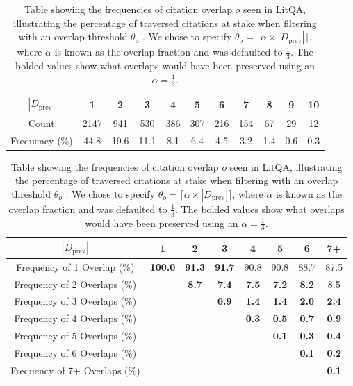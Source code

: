 \begin{table}[htb]
\caption{Various statistics on citation traversal.}
\begin{subtable}{\textwidth}
\centering
\begin{tabular}{| c || c c c c c c c c c c |}
\hline
$|D_\text{prev}|$ & 1 & 2 & 3 & 4 & 5 & 6 & 7 & 8 & 9 & 10 \\
\hline
Count & 2147 & 941 & 530 & 386 & 307 & 216 & 154 & 67 & 29 & 12 \\
\hline
Frequency (\%) & 44.8 & 19.6 & 11.1 & 8.1 & 6.4 & 4.5 & 3.2 & 1.4 & 0.6 & 0.3 \\
\hline
\end{tabular}
\caption{Distribution of traversal starting paper count $|D_\text{prev}|$.}
\label{tab:cit-trav-starting-dist}
\end{subtable}

\begin{subtable}{\textwidth}
\centering
\begin{tabular}{| c || c c c c c c c |}
\hline
$|D_\text{prev}|$ & 1 & 2 & 3 & 4 & 5 & 6 & 7+ \\
\hline
Frequency of 1 Overlap (\%) & \textbf{100.0} & \textbf{91.3} & \textbf{91.7} & 90.8 & 90.8 & 88.7 & 87.5 \\
\hline
Frequency of 2 Overlaps (\%) & \cellcolor{gray!25} & \textbf{8.7} & \textbf{7.4} & \textbf{7.5} & \textbf{7.2} & \textbf{8.2} & 8.5 \\
\hline
Frequency of 3 Overlaps (\%) & \cellcolor{gray!25} & \cellcolor{gray!25} & \textbf{0.9} & \textbf{1.4} & \textbf{1.4} & \textbf{2.0} & \textbf{2.4} \\
\hline
Frequency of 4 Overlaps (\%) & \cellcolor{gray!25} & \cellcolor{gray!25} & \cellcolor{gray!25} & \textbf{0.3} & \textbf{0.5} & \textbf{0.7} & \textbf{0.9} \\
\hline
Frequency of 5 Overlaps (\%) & \cellcolor{gray!25} & \cellcolor{gray!25} & \cellcolor{gray!25} & \cellcolor{gray!25} & \textbf{0.1} & \textbf{0.3} & \textbf{0.4} \\
\hline
Frequency of 6 Overlaps (\%) & \cellcolor{gray!25} & \cellcolor{gray!25} & \cellcolor{gray!25} & \cellcolor{gray!25} & \cellcolor{gray!25} & \textbf{0.1} & \textbf{0.2} \\
\hline
Frequency of 7+ Overlaps (\%) & \cellcolor{gray!25} & \cellcolor{gray!25} & \cellcolor{gray!25} & \cellcolor{gray!25} & \cellcolor{gray!25} & \cellcolor{gray!25} & \textbf{0.1} \\
\hline
\end{tabular}
\caption{Table showing the frequencies of citation overlap $o$ seen in LitQA, illustrating the percentage of traversed citations at stake when filtering with an overlap threshold $\theta_o$ . We chose to specify $\theta_o = \lceil \alpha \times |D_\text{prev}| \rceil$, where $\alpha$ is known as the overlap fraction and was defaulted to $\frac{1}{3}$. The bolded values show what overlaps would have been preserved using an $\alpha = \frac{1}{3}$.}
\label{tab:cit-trav-overlap-dist}
\end{subtable}
\end{table}

